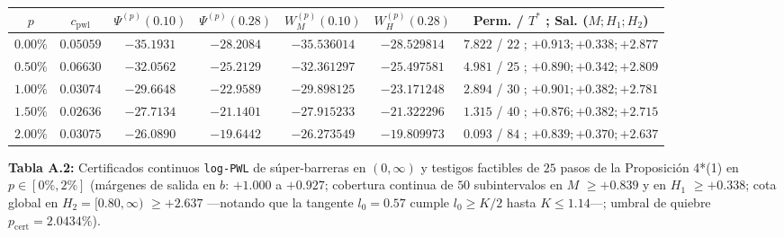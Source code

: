 \documentclass[11pt,letterpaper]{article}
\theoremstyle{plain}
\begin{document}
\begin{table}[htbp]
\centering
\scriptsize
\setlength{\tabcolsep}{3.5pt}
\begin{tabular}{@{}ccccccc@{}}
\toprule
$p$ & $c_{\mathrm{pwl}}$ & $\Psi^{(p)}(0.10)$ & $\Psi^{(p)}(0.28)$ & $W_M^{(p)}(0.10)$ & $W_H^{(p)}(0.28)$ & Perm. / $T^*$ ; Sal. ($M; H_1; H_2$) \\
\midrule
$0.00\%$ & $0.05059$ & $-35.1931$ & $-28.2084$ & $-35.536014$ & $-28.529814$ & $7.822$ / $22$ ; $+0.913; +0.338; +2.877$ \\
$0.50\%$ & $0.06630$ & $-32.0562$ & $-25.2129$ & $-32.361297$ & $-25.497581$ & $4.981$ / $25$ ; $+0.890; +0.342; +2.809$ \\
$1.00\%$ & $0.03074$ & $-29.6648$ & $-22.9589$ & $-29.898125$ & $-23.171248$ & $2.894$ / $30$ ; $+0.901; +0.382; +2.781$ \\
$1.50\%$ & $0.02636$ & $-27.7134$ & $-21.1401$ & $-27.915233$ & $-21.322296$ & $1.315$ / $40$ ; $+0.876; +0.382; +2.715$ \\
$2.00\%$ & $0.03075$ & $-26.0890$ & $-19.6442$ & $-26.273549$ & $-19.809973$ & $0.093$ / $84$ ; $+0.839; +0.370; +2.637$ \\
\bottomrule
\end{tabular}
\par\vspace{0.45em}
\begin{minipage}{0.95\linewidth}\centering\footnotesize
\textbf{Tabla A.2:} Certificados continuos \texttt{log-PWL} de súper-barreras en $(0,\infty)$ y testigos factibles de $25$ pasos de la Proposición 4*(1) en $p\in[0\%,2\%]$ (márgenes de salida en $b$: $+1.000$ a $+0.927$; cobertura continua de $50$ subintervalos en $M$ $\ge +0.839$ y en $H_1$ $\ge +0.338$; cota global en $H_2=[0.80,\infty)$ $\ge +2.637$ ---notando que la tangente $l_0=0.57$ cumple $l_0\ge K/2$ hasta $K\le 1.14$---; umbral de quiebre $p_{\mathrm{cert}}=2.0434\%$).
\end{minipage}
\end{table}
\end{document}
